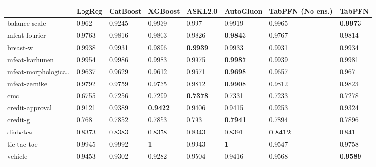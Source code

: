 \begin{tabular}{llllllll}
\toprule
{} &           LogReg &         CatBoost &          XGBoost &          ASKL2.0 &                AutoGluon & TabPFN (No ens.) &           TabPFN \\
\midrule
balance-scale        &            0.962 &           0.9245 &           0.9939 &            0.997 &                   0.9919 &           0.9965 &  \textbf{0.9973} \\
mfeat-fourier        &           0.9763 &           0.9816 &           0.9803 &           0.9826 &          \textbf{0.9843} &           0.9767 &           0.9814 \\
breast-w             &           0.9938 &           0.9931 &           0.9896 &  \textbf{0.9939} &                   0.9933 &           0.9931 &           0.9934 \\
mfeat-karhunen       &           0.9954 &           0.9986 &           0.9983 &           0.9975 &          \textbf{0.9987} &           0.9939 &           0.9981 \\
mfeat-morphologica.. &           0.9637 &           0.9629 &           0.9612 &           0.9671 &          \textbf{0.9698} &           0.9657 &            0.967 \\
mfeat-zernike        &           0.9792 &           0.9759 &           0.9735 &           0.9812 &          \textbf{0.9908} &           0.9812 &           0.9823 \\
cmc                  &           0.6755 &           0.7256 &           0.7299 &  \textbf{0.7378} &                   0.7331 &           0.7233 &           0.7278 \\
credit-approval      &           0.9121 &           0.9389 &  \textbf{0.9422} &           0.9406 &                   0.9415 &           0.9253 &           0.9324 \\
credit-g             &            0.768 &           0.7852 &           0.7853 &            0.793 &          \textbf{0.7941} &           0.7894 &           0.7896 \\
diabetes             &           0.8373 &           0.8383 &           0.8378 &           0.8343 &                   0.8391 &  \textbf{0.8412} &            0.841 \\
tic-tac-toe          &           0.9945 &           0.9992 &       \textbf{1} &           0.9943 &               \textbf{1} &           0.9547 &           0.9758 \\
vehicle              &           0.9453 &           0.9302 &           0.9282 &           0.9504 &                   0.9416 &           0.9568 &  \textbf{0.9589} \\

\end{tabular}
